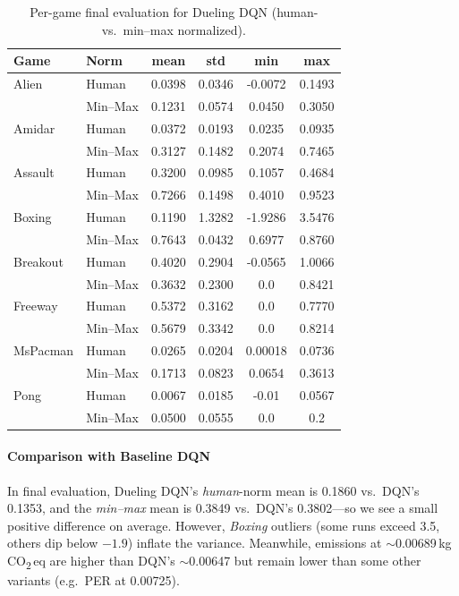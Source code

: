 \begin{table}
	\caption{Per-game final evaluation for Dueling DQN (human- vs.\ min--max normalized).}
	\label{tab:dueling_dqn_eval_gamewise}
	\centering
	\begin{tabular}{llcccc}
		\toprule
		\textbf{Game} & \textbf{Norm} & \textbf{mean} & \textbf{std} & \textbf{min} & \textbf{max}\\
		\midrule
		Alien     & Human    & 0.0398 & 0.0346 & -0.0072 & 0.1493 \\
		& Min--Max & 0.1231 & 0.0574 & 0.0450  & 0.3050 \\
		\cmidrule{1-6}
		Amidar    & Human    & 0.0372 & 0.0193 & 0.0235 & 0.0935 \\
		& Min--Max & 0.3127 & 0.1482 & 0.2074 & 0.7465 \\
		\cmidrule{1-6}
		Assault   & Human    & 0.3200 & 0.0985 & 0.1057 & 0.4684 \\
		& Min--Max & 0.7266 & 0.1498 & 0.4010 & 0.9523 \\
		\cmidrule{1-6}
		Boxing    & Human    & 0.1190 & 1.3282 & -1.9286 & 3.5476 \\
		& Min--Max & 0.7643 & 0.0432 & 0.6977  & 0.8760 \\
		\cmidrule{1-6}
		Breakout  & Human    & 0.4020 & 0.2904 & -0.0565 & 1.0066 \\
		& Min--Max & 0.3632 & 0.2300 & 0.0     & 0.8421 \\
		\cmidrule{1-6}
		Freeway   & Human    & 0.5372 & 0.3162 & 0.0     & 0.7770 \\
		& Min--Max & 0.5679 & 0.3342 & 0.0     & 0.8214 \\
		\cmidrule{1-6}
		MsPacman  & Human    & 0.0265 & 0.0204 & 0.00018 & 0.0736 \\
		& Min--Max & 0.1713 & 0.0823 & 0.0654  & 0.3613 \\
		\cmidrule{1-6}
		Pong      & Human    & 0.0067 & 0.0185 & -0.01 & 0.0567 \\
		& Min--Max & 0.0500 & 0.0555 & 0.0   & 0.2 \\
		\bottomrule
	\end{tabular}
\end{table}

\paragraph{Comparison with Baseline DQN}
In final evaluation, Dueling DQN's \emph{human}-norm mean is \num{0.1860} vs.\ DQN's \num{0.1353}, 
and the \emph{min--max} mean is \num{0.3849} vs.\ DQN's \num{0.3802}—so we see a small positive difference on average.
However, \emph{Boxing} outliers (some runs exceed 3.5, others dip below $-1.9$) inflate the variance.
Meanwhile, emissions at $\sim$\num{0.00689}\,kg\,CO\textsubscript{2}\,eq are higher than DQN's $\sim$\num{0.00647} but remain
lower than some other variants (e.g.\ PER at \num{0.00725}).

